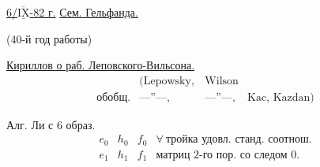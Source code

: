 \underline{6/$\overline{\underline{\mathrm{IX}}}$-82 г.}\qquad
\underline{Сем. Гельфанда.}

\hfill (40-й год работы)

\underline{Кириллов о раб. Леповского-Вильсона.}
\[
\begin{array}{rlll}
&(\text{Lepowsky},&\text{Wilson}&\\
\text{обобщ.}&\text{---''---},&\text{---''---},&\text{Kac, Kazdan})
\end{array}
\]

Алг. Ли с 6 образ.
\[
\begin{array}{ccc|l}
e_0&h_0&f_0&\forall\ \text{тройка удовл. станд. соотнош.}\\
e_1&h_1&f_1&\text{матриц 2-го пор. со следом }0.
\end{array}
\]


